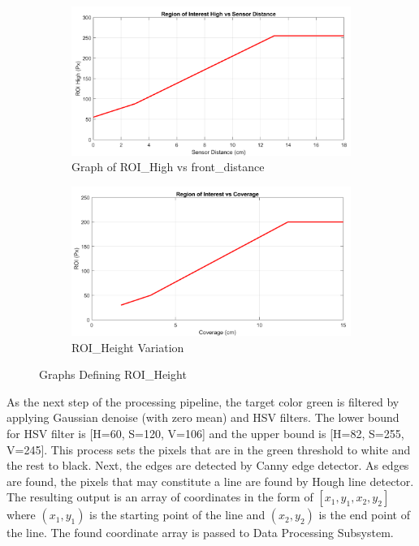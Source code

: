 \documentclass[a4paper,12pt]{article}
\begin{document}
\begin{enumerate}[A.]
\begin{figure}[t!]
	\begin{subfigure}{.46\textwidth}
		
		\centering
		
		\includegraphics[width=0.44\unitlength]{images/ROT_ROI/ROI_HIGH_crop}
		
		\caption{ Graph of ROI\_High vs front\_distance}
		
	\end{subfigure}%
	\begin{subfigure}{.46\textwidth}
		
		\centering
		
		\includegraphics[width=0.44\unitlength]{images/ROT_ROI/ROI_crop}
		
		\caption{ ROI\_Height Variation}
		
	\end{subfigure}
	
	\caption{\label{fig:ROI_crop} Graphs Defining ROI\_Height}
	
\end{figure}

As the next step of the processing pipeline, the target color green is filtered by applying Gaussian denoise (with zero mean) and HSV filters. The lower bound for HSV filter is [H=60, S=120, V=106] and the upper bound is [H=82, S=255, V=245]. This process sets the pixels that are in the green threshold to white and the rest to black. Next, the edges are detected by Canny edge detector. As edges are found, the pixels that may constitute a line are found by Hough line detector. The resulting output is an array of coordinates in the form of $[x_1, y_1, x_2, y_2]$ where $(x_1, y_1)$ is the starting point of the line and $(x_2, y_2)$ is the end point of the line. The found coordinate array is passed to Data Processing Subsystem.






\end{enumerate}
\end{document}
